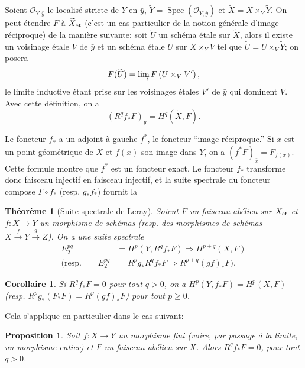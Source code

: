 \documentclass{article}
\DeclareMathOperator{\spec}{Spec}
\newcommand{\et}[1]{{#1}_{\textnormal{et}}}
\newcommand{\cO}{\mathcal{O}}
\newtheorem{proposition}[subsubsection]{Proposition}
\newtheorem{corollary}[subsubsection]{Corollaire}
\newtheorem{theorem}[subsubsection]{Théorème}
\begin{document}
Soient $\cO_{Y,\bar y}$ le localisé stricte de $Y$ en $\bar y$, 
$\widetilde Y=\spec(\cO_{Y,\bar y})$ et $\widetilde X=X\times_Y \widetilde Y$. 
On peut étendre $F$ à $\et{\widetilde X}$ (c'est un cas particulier de la 
notion générale d'image réciproque) de la manière suivante: soit 
$\widetilde U$ un schéma étale sur $\widetilde X$, alors il existe un 
voisinage étale $V$ de $\bar y$ et un schéma étale $U$ sur $X\times_Y V$ tel 
que $\widetilde U=U\times_V \widetilde Y$; on posera 
\[
  F(\widetilde U)=\varinjlim F\left(U\times_V V'\right)\text{,}
\]
le limite inductive étant prise sur les voisinages étales $V'$ de $\bar y$ qui 
dominent $V$. Avec cette définition, on a 
\[
  \left(R^q f_* F\right)_{\bar y} = H^q(\widetilde X,F)\text{.}
\]

Le foncteur $f_*$ a un adjoint à gauche $f^*$, le foncteur ``image 
réciproque.'' Si $\bar x$ est un point géométrique de $X$ et $f(\bar x)$ son 
image dans $Y$, on a $(f^* F)_{\bar x} = F_{f(\bar x)}$. Cette formule montre 
que $f^*$ est un foncteur exact. Le foncteur $f_*$ transforme donc faisceau 
injectif en faisceau injectif, et la suite spectrale du foncteur compose 
$\Gamma\circ f_*$ (resp. $g_* f_*$) fournit la 





\begin{theorem}[Suite spectrale de Leray]\label{2-3-4}
Soient $F$ un faisceau abélien sur $\et X$ et $f:X\to Y$ un morphisme de 
schémas (resp. des morphismes de schémas $X\xrightarrow f Y \xrightarrow g Z$). 
On a une suite spectrale 
\begin{align*}
  E_2^{pq} &= H^p(Y,R^q f_* F) \Rightarrow H^{p+q}(X,F) \\
  \text{(resp.}\qquad E_2^{pq} &= R^p g_* R^q f_* F \Rightarrow R^{p+q}(gf)_* F\text{).}
\end{align*}
\end{theorem}





\begin{corollary}\label{2-3-5}
Si $R^q f_* F=0$ pour tout $q>0$, on a $H^p(Y,f_* F)=H^p(X,F)$ (resp. 
$R^p g_*(F_* F) = R^p(g f)_* F$) pour tout $p\geqslant 0$. 
\end{corollary}

Cela s'applique en particulier dans le cas suivant:





\begin{proposition}\label{2-3-6}
Soit $f:X\to Y$ un morphisme fini (voire, par passage à la limite, un 
morphisme entier) et $F$ un faisceau abélien sur $X$. Alors $R^q f_* F=0$, 
pour tout $q>0$.
\end{proposition}
\end{document}
